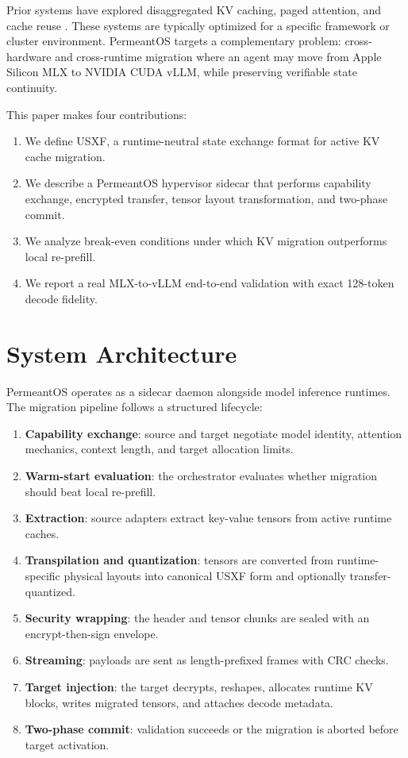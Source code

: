 \documentclass[11pt]{article}
\begin{document}
Prior systems have explored disaggregated KV caching, paged attention, and cache reuse \cite{kwon2023pagedattention, zheng2024lmsys, liu2024cachegen}. These systems are typically optimized for a specific framework or cluster environment. PermeantOS targets a complementary problem: cross-hardware and cross-runtime migration where an agent may move from Apple Silicon MLX to NVIDIA CUDA vLLM, while preserving verifiable state continuity.

This paper makes four contributions:
\begin{enumerate}[leftmargin=*]
  \item We define USXF, a runtime-neutral state exchange format for active KV cache migration.
  \item We describe a PermeantOS hypervisor sidecar that performs capability exchange, encrypted transfer, tensor layout transformation, and two-phase commit.
  \item We analyze break-even conditions under which KV migration outperforms local re-prefill.
  \item We report a real MLX-to-vLLM end-to-end validation with exact 128-token decode fidelity.
\end{enumerate}

\section{System Architecture}

PermeantOS operates as a sidecar daemon alongside model inference runtimes. The migration pipeline follows a structured lifecycle:

\begin{enumerate}[leftmargin=*]
  \item \textbf{Capability exchange}: source and target negotiate model identity, attention mechanics, context length, and target allocation limits.
  \item \textbf{Warm-start evaluation}: the orchestrator evaluates whether migration should beat local re-prefill.
  \item \textbf{Extraction}: source adapters extract key-value tensors from active runtime caches.
  \item \textbf{Transpilation and quantization}: tensors are converted from runtime-specific physical layouts into canonical USXF form and optionally transfer-quantized.
  \item \textbf{Security wrapping}: the header and tensor chunks are sealed with an encrypt-then-sign envelope.
  \item \textbf{Streaming}: payloads are sent as length-prefixed frames with CRC checks.
  \item \textbf{Target injection}: the target decrypts, reshapes, allocates runtime KV blocks, writes migrated tensors, and attaches decode metadata.
  \item \textbf{Two-phase commit}: validation succeeds or the migration is aborted before target activation.
\end{enumerate}
\end{document}
